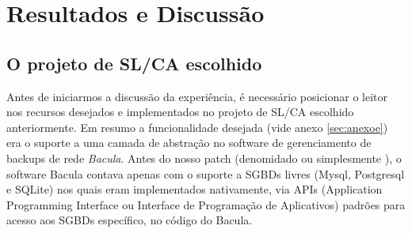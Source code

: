 % 
% 
% 
% 

\section{Resultados e Discussão} \label{sec:resultados}
\subsection{O projeto de SL/CA escolhido} \label{subsec:sobre}
Antes de iniciarmos a discussão da experiência, é necessário posicionar o leitor nos recursos desejados e implementados no projeto de SL/CA escolhido anteriormente. Em resumo a funcionalidade desejada (vide anexo \ref{sec:anexoe}) era o suporte a uma camada de abstração no software de gerenciamento de backups de rede \textit{Bacula}. Antes do nosso patch (denomidado \patch ou simplesmente \patchshort), o software Bacula contava apenas com o suporte a SGBDs livres (Mysql, Postgresql e SQLite) nos quais eram implementados nativamente, via APIs (Application Programming Interface ou Interface de Programação de Aplicativos) padrões para acesso aos SGBDs específico, no código do Bacula. 

